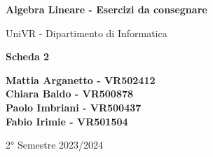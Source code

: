 \begin{titlepage}
	\begin{center}
		\vspace*{1cm}

		\Huge
		\textbf{Algebra Lineare - Esercizi da consegnare}

		\vspace{0.5cm}
		\LARGE
		UniVR - Dipartimento di Informatica

		\vspace{1cm}
		\huge
		\textbf{Scheda 2}
		\vspace{1.5cm}


		\vfill


		\vspace{0.8cm}

		\Large
		\textbf{Mattia Arganetto - VR502412}\\
		\textbf{Chiara Baldo - VR500878}\\
		\textbf{Paolo Imbriani - VR500437}\\
		\textbf{Fabio Irimie - VR501504}

		\vspace{0.5cm}

		2° Semestre 2023/2024

	\end{center}
\end{titlepage}
